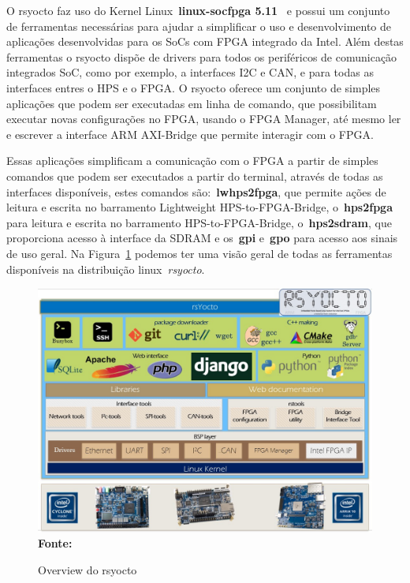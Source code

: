 O rsyocto faz uso do Kernel Linux~\textbf{linux-socfpga 5.11}~\cite{linuxsocfpga} e possui um conjunto de ferramentas necessárias para ajudar a simplificar o uso e desenvolvimento de aplicações desenvolvidas para os SoCs com FPGA integrado da Intel. Além destas ferramentas o rsyocto dispõe de drivers para todos os periféricos de comunicação integrados SoC, como por exemplo, a interfaces I2C e CAN, e para todas as interfaces entres o HPS e o FPGA\@. O rsyocto oferece um conjunto de simples aplicações que podem ser executadas em linha de comando, que possibilitam executar novas configurações no FPGA, usando o FPGA Manager, até mesmo ler e escrever a interface ARM AXI-Bridge que permite interagir com o FPGA\@. 

Essas aplicações simplificam a comunicação com o FPGA a partir de simples comandos que podem ser executados a partir do terminal, através de todas as interfaces disponíveis, estes comandos são:~\textbf{lwhps2fpga}, que permite ações de leitura e escrita no barramento Lightweight HPS-to-FPGA-Bridge, o~\textbf{hps2fpga} para leitura e escrita no barramento HPS-to-FPGA-Bridge, o~\textbf{hps2sdram}, que proporciona acesso à interface da SDRAM e os~\textbf{gpi} e~\textbf{gpo} para acesso aos sinais de uso geral. Na Figura~\ref{fig:rsyocto} podemos ter uma visão geral de todas as ferramentas disponíveis na distribuição linux~\textit{rsyocto}.


\begin{figure}[ht]
	\caption{Overview do rsyocto}
	\begin{center}
		\includegraphics[scale=0.45]{imagens/rsYoctoLayers.jpg}\\
		{\small \textbf{Fonte:}\cite{rsyocto}}
    \end{center}\label{fig:rsyocto}
\end{figure}

